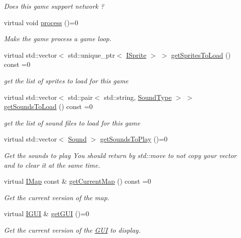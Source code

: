 \begin{DoxyCompactItemize}
\begin{DoxyCompactList}\small\item\em Does this game support network ? \end{DoxyCompactList}\item 
virtual void \hyperlink{classarcade_1_1_i_game_af0111a41083f38a1af1a7f94287e6e77}{process} ()=0
\begin{DoxyCompactList}\small\item\em Make the game process a game loop. \end{DoxyCompactList}\item 
virtual std\+::vector$<$ std\+::unique\+\_\+ptr$<$ \hyperlink{classarcade_1_1_i_sprite}{I\+Sprite} $>$ $>$ \hyperlink{classarcade_1_1_i_game_a2d0dc7c78a68c4dd0359911775993f68}{get\+Sprites\+To\+Load} () const =0
\begin{DoxyCompactList}\small\item\em get the list of sprites to load for this game \end{DoxyCompactList}\item 
virtual std\+::vector$<$ std\+::pair$<$ std\+::string, \hyperlink{namespacearcade_a3bb4743a2eea59f3927e404e6549cae5}{Sound\+Type} $>$ $>$ \hyperlink{classarcade_1_1_i_game_a0b66cd9ef3b5cd0dff95debb7e4f594e}{get\+Sounds\+To\+Load} () const =0
\begin{DoxyCompactList}\small\item\em get the list of sound files to load for this game \end{DoxyCompactList}\item 
virtual std\+::vector$<$ \hyperlink{structarcade_1_1_sound}{Sound} $>$ \hyperlink{classarcade_1_1_i_game_a88b3c7efb13780cdbbdf5b879a18ed4d}{get\+Sounds\+To\+Play} ()=0
\begin{DoxyCompactList}\small\item\em Get the sounds to play You should return by std\+::move to not copy your vector and to clear it at the same time. \end{DoxyCompactList}\item 
virtual \hyperlink{classarcade_1_1_i_map}{I\+Map} const  \& \hyperlink{classarcade_1_1_i_game_a2e1791071bf65ee35e249e409ee29044}{get\+Current\+Map} () const =0
\begin{DoxyCompactList}\small\item\em Get the current version of the map. \end{DoxyCompactList}\item 
virtual \hyperlink{classarcade_1_1_i_g_u_i}{I\+G\+UI} \& \hyperlink{classarcade_1_1_i_game_abe849a6ed370a18de51bc8cb7a2329ba}{get\+G\+UI} ()=0
\begin{DoxyCompactList}\small\item\em Get the current version of the \hyperlink{classarcade_1_1_g_u_i}{G\+UI} to display. \end{DoxyCompactList}\end{DoxyCompactItemize}


